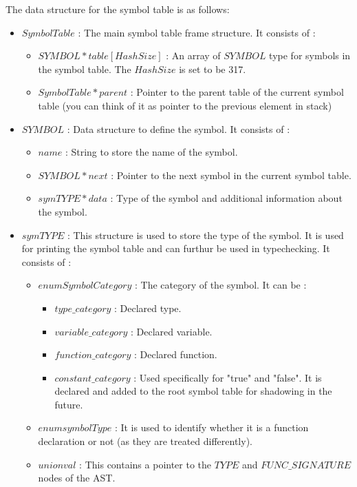 \documentclass[preprint,12pt]{elsarticle}
\begin{document}
The data structure for the symbol table is as follows:
\begin{itemize}
\item $SymbolTable$ : The main symbol table frame structure. It consists of : 
\begin{itemize}
\item $SYMBOL *table[HashSize]$ : An array of $SYMBOL$ type for symbols in the symbol table. The $HashSize$ is set to be 317.
\item $SymbolTable *parent$ : Pointer to the parent table of the current symbol table (you can think of it as pointer to the previous element in stack)
\end{itemize}
\item $SYMBOL$ : Data structure to define the symbol. It consists of : 
\begin{itemize}
\item $name$ : String to store the name of the symbol.
\item $SYMBOL *next$ : Pointer to the next symbol in the current symbol table.
\item $symTYPE *data$ : Type of the symbol and additional information about the symbol.
\end{itemize}
\item $symTYPE$ : This structure is used to store the type of the symbol. It is used for printing the symbol table and can furthur be used in typechecking. It consists of : 
\begin{itemize}
\item $enum SymbolCategory$ : The category of the symbol. It can be : 
\begin{itemize}
\item $type\_category$ : Declared type.
\item $variable\_category$ : Declared variable.
\item $function\_category$ : Declared function.
\item $constant\_category$ : Used specifically for "true" and "false". It is declared and added to the root symbol table for shadowing in the future.
\end{itemize}
\item $enum symbolType$ : It is used to identify whether it is a function declaration or not (as they are treated differently).
\item $union val$ : This contains a pointer to the $TYPE$ and $FUNC\_SIGNATURE$ nodes of the AST.
\end{itemize}
\end{itemize}
\end{document}
